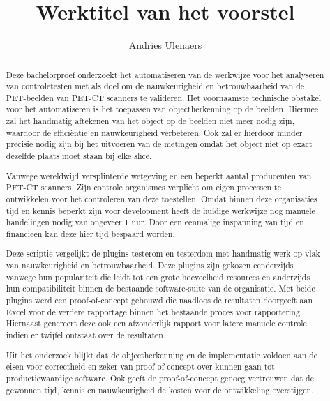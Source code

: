 \documentclass{hogent-article}
\title{Werktitel van het voorstel}
\author{Andries Ulenaers}
\begin{document}
\begin{abstract}
  Deze bachelorproef onderzoekt het automatiseren van de werkwijze voor het analyseren van controletesten met als doel om de nauwkeurigheid en betrouwbaarheid van de PET-beelden van PET-CT scanners te valideren. Het voornaamste technische obstakel voor het automatiseren is het toepassen van objectherkenning op de beelden. Hiermee zal het handmatig aftekenen van het object op de beelden niet meer nodig zijn, waardoor de efficiëntie en nauwkeurigheid verbeteren. Ook zal er hierdoor minder precisie nodig zijn bij het uitvoeren van de metingen omdat het object niet op exact dezelfde plaats moet staan bij elke slice.

  Vanwege wereldwijd versplinterde wetgeving en een beperkt aantal producenten van PET-CT scanners. Zijn controle organismes verplicht om eigen processen te ontwikkelen voor het controleren van deze toestellen. Omdat binnen deze organisaties tijd en kennis beperkt zijn voor development heeft de huidige werkwijze nog manuele handelingen nodig van ongeveer 1 uur. Door een eenmalige inspanning van tijd en financieen kan deze hier tijd bespaard worden.

  Deze scriptie vergelijkt de plugins testerom en testerdom met handmatig werk op vlak van nauwkeurigheid en betrouwbaarheid. Deze plugins zijn gekozen eenderzijds vanwege hun populariteit die leidt tot een grote hoeveelheid resources en anderzijds hun compatibiliteit binnen de bestaande software-suite van de organisatie. Met beide plugins werd een proof-of-concept gebouwd die naadloos de resultaten doorgeeft aan Excel voor de verdere rapportage binnen het bestaande proces voor rapportering. Hiernaast genereert deze ook een afzonderlijk rapport voor latere manuele controle indien er twijfel ontstaat over de resultaten.

  Uit het onderzoek blijkt dat de objectherkenning en de implementatie voldoen aan de eisen voor correctheid en zeker van proof-of-concept over kunnen gaan tot productiewaardige software. Ook geeft de proof-of-concept genoeg vertrouwen dat de gewonnen tijd, kennis en nauwkeurigheid de kosten voor de ontwikkeling overstijgen.
  
\end{abstract}

\tableofcontents

\bigskip

\end{document}
